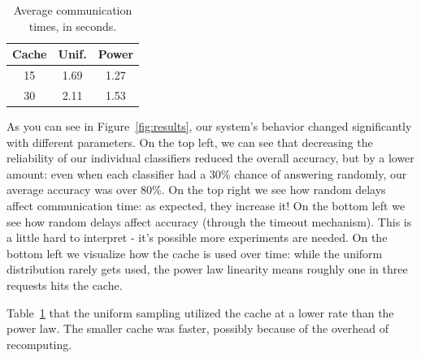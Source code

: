 \documentclass[11pt]{article}
\begin{document}
\begin{table}
    \begin{tabular}{|c|c|c|}
        \hline
        Cache &  Unif. &  Power \\ \hline \hline
        15 & 1.69 & 1.27 \\ \hline
        30 & 2.11 & 1.53 \\ \hline
    \end{tabular}
    \caption{Average communication times, in seconds.}%
    \label{tab:cache}
\end{table}

As you can see in Figure~\ref{fig:results}, our system's behavior changed significantly with different parameters.
On the top left, we can see that decreasing the reliability of our individual classifiers reduced the overall accuracy, but by a lower amount: 
    even when each classifier had a 30\% chance of answering randomly, our average accuracy was over 80\%.
On the top right we see how random delays affect communication time: as expected, they increase it!
On the bottom left we see how random delays affect accuracy (through the timeout mechanism).
This is a little hard to interpret - it's possible more experiments are needed.
On the bottom left we visualize how the cache is used over time: while the uniform distribution rarely gets used, the power law linearity means roughly one in three requests hits the cache.

Table~\ref{tab:cache} that the uniform sampling utilized the cache at a lower rate than the power law.
The smaller cache was faster, possibly because of the overhead of recomputing.
\end{document}
